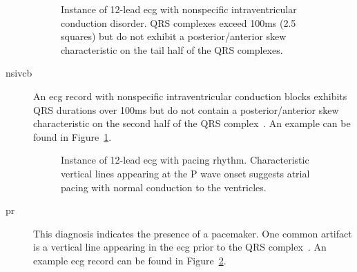 \documentclass[\main/thesis.tex]{subfiles}
\begin{document}
\begin{description}
    \begin{figure}[H]
        \centering
        \caption{Instance of 12-lead \gls{ecg} with nonspecific intraventricular conduction disorder. QRS complexes exceed 100ms (2.5 squares) but do not exhibit a posterior/anterior skew characteristic on the tail half of the QRS complexes.}
        \label{fig:full_NSIVCB}
    \end{figure}
    \item[\gls{nsivcb}] An \gls{ecg} record with nonspecific intraventricular conduction blocks exhibits QRS durations over 100ms but do not contain a posterior/anterior skew characteristic on the second half of the QRS complex~\cite{ecg-utah-lesson}.
    An example can be found in Figure~\ref{fig:full_NSIVCB}.

    \begin{figure}[H]
        \centering
        \caption{Instance of 12-lead \gls{ecg} with pacing rhythm. Characteristic vertical lines appearing at the P wave onset suggests atrial pacing with normal conduction to the ventricles.}
        \label{fig:full_PR}
    \end{figure}
    \item[\gls{pr}] This diagnosis indicates the presence of a pacemaker. One common artifact is a vertical line appearing in the \gls{ecg} prior to the QRS complex~\cite{kirk_basic_2007}.
    An example \gls{ecg} record can be found in Figure~\ref{fig:full_PR}.


\end{description}
\end{document}
